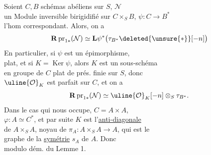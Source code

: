  Soient $C,B$ schémas abéliens sur $S$,  $\mathcal N$\\
un Module inversible birigidifié sur $C\times_S B$, $\psi:C\longrightarrow B^*$\\
l'hom correspondant. Alors, on a
\[
\mathbf R\operatorname{pr}_{1*}(\mathcal N)\simeq\mathbf L\psi^*\bigl(\tau_{B^*}\deleted{\unsure{*}}[-n]\bigr)
\]
En particulier, si $\psi$ est un épimorphisme, \\
plat, et si $K=\operatorname{Ker}\psi$, alors $K$ est un sous-schéma\\
en groupe de $C$ plat de prés. finie sur $S$, donc \\
$\uline{\mathcal O}_K$ est  parfait sur $C$, et on a
\[
\mathbf R\operatorname{pr}_{1*}(\mathcal N)\simeq\uline{\mathcal O}_K[-n]\otimes_S\tau_{B^*}.
\]
Dans le cas qui nous occupe, $C=A\times A$, \\
$\varphi:A\simeq C^*$, et  par suite $K$ est l'\uline{anti-diagonale}\\
de $A\times_S A$, noyau de $\pi_A:A\times_S A\longrightarrow A$, qui est le\\
graphe de la \uline{symétrie} $s_A$ de $A$. Donc \\
modulo dém. du Lemme 1.
